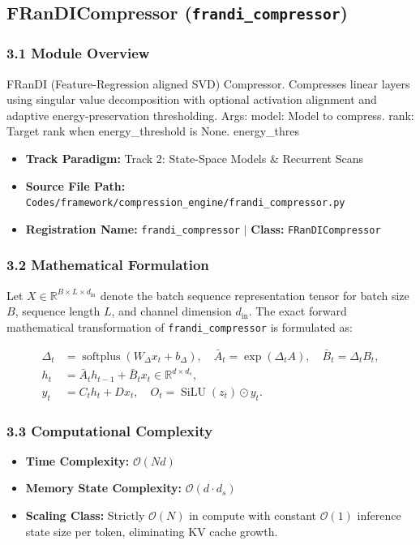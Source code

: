 \subsection{FRanDICompressor (\texttt{frandi\_compressor})}
\label{sec:app_module_frandi_compressor}

\subsubsection*{3.1 Module Overview}
FRanDI (Feature-Regression aligned SVD) Compressor. Compresses linear layers using singular value decomposition with optional activation alignment and adaptive energy-preservation thresholding.  Args:     model: Model to compress.     rank: Target rank when energy\_threshold is None.     energy\_thres
\begin{itemize}
    \item \textbf{Track Paradigm:} Track 2: State-Space Models & Recurrent Scans
    \item \textbf{Source File Path:} \texttt{Codes/framework/compression\_engine/frandi\_compressor.py}
    \item \textbf{Registration Name:} \texttt{frandi\_compressor} $\mid$ \textbf{Class:} \texttt{FRanDICompressor}
\end{itemize}

\subsubsection*{3.2 Mathematical Formulation}
Let $X \in \mathbb{R}^{B \times L \times d_{\text{in}}}$ denote the batch sequence representation tensor for batch size $B$, sequence length $L$, and channel dimension $d_{\text{in}}$. The exact forward mathematical transformation of \texttt{frandi\_compressor} is formulated as:

\begin{align}
\Delta_t &= \operatorname{softplus}(W_\Delta x_t + b_\Delta), \quad \bar{A}_t = \exp(\Delta_t A), \quad \bar{B}_t = \Delta_t B_t, \\
h_t &= \bar{A}_t h_{t-1} + \bar{B}_t x_t \in \mathbb{R}^{d \times d_s}, \\
y_t &= C_t h_t + D x_t, \quad O_t = \operatorname{SiLU}(z_t) \odot y_t.
\end{align}


\subsubsection*{3.3 Computational Complexity}
\begin{itemize}
    \item \textbf{Time Complexity:} $\mathcal{O}(N d)$
    \item \textbf{Memory State Complexity:} $\mathcal{O}(d \cdot d_s)$
    \item \textbf{Scaling Class:} Strictly $\mathcal{O}(N)$ in compute with constant $\mathcal{O}(1)$ inference state size per token, eliminating KV cache growth.
\end{itemize}

